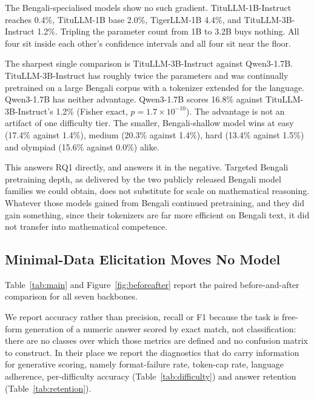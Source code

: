 The Bengali-specialised models show no such gradient. TituLLM-1B-Instruct
reaches 0.4\%, TituLLM-1B base 2.0\%, TigerLLM-1B 4.4\%, and TituLLM-3B-Instruct
1.2\%. Tripling the parameter count from 1B to 3.2B buys nothing. All four sit
inside each other's confidence intervals and all four sit near the floor.

The sharpest single comparison is TituLLM-3B-Instruct against Qwen3-1.7B.
TituLLM-3B-Instruct has roughly twice the parameters and was continually
pretrained on a large Bengali corpus with a tokenizer extended for the
language. Qwen3-1.7B has neither advantage. Qwen3-1.7B scores 16.8\% against
TituLLM-3B-Instruct's 1.2\% (Fisher exact, $p=1.7\times10^{-10}$). The
advantage is not an artifact of one difficulty tier. The smaller, Bengali-shallow model wins at easy (17.4\% against 1.4\%),
medium (20.3\% against 1.4\%), hard (13.4\% against 1.5\%) and olympiad (15.6\%
against 0.0\%) alike.

This answers RQ1 directly, and answers it in the negative. Targeted Bengali
pretraining depth, as delivered by the two publicly released Bengali model
families we could obtain, does not substitute for scale on mathematical
reasoning. Whatever those models gained from Bengali continued pretraining, and
they did gain something, since their tokenizers are far more efficient on
Bengali text, it did not transfer into mathematical competence.

\subsection{Minimal-Data Elicitation Moves No Model}
\label{sec:rq1b}

Table~\ref{tab:main} and Figure~\ref{fig:beforeafter} report the paired
before-and-after comparison for all seven backbones.

We report accuracy rather than precision, recall or F1 because the task is
free-form generation of a numeric answer scored by exact match, not
classification: there are no classes over which those metrics are defined and
no confusion matrix to construct. In their place we report the diagnostics that
do carry information for generative scoring, namely format-failure rate,
token-cap rate, language adherence, per-difficulty accuracy
(Table~\ref{tab:difficulty}) and answer retention
(Table~\ref{tab:retention}).

